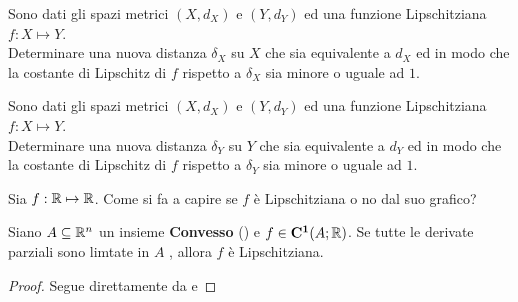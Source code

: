 \begin{example}
	Sono dati gli spazi metrici $(X,d_X)$ e $(Y,d_Y)$ ed una funzione Lipschitziana $f: X \mapsto Y$.\\
	Determinare una nuova distanza $\delta_X$ su $X$ che sia equivalente a $d_X$ ed in modo che la costante di Lipschitz di $f$ rispetto a $\delta_X$ sia minore o uguale ad $1$.
\end{example}
\begin{example}
	Sono dati gli spazi metrici $(X,d_X)$ e $(Y,d_Y)$ ed una funzione Lipschitziana $f: X \mapsto Y$.\\
	Determinare una nuova distanza $\delta_Y$ su $Y$ che sia equivalente a $d_Y$ ed in modo che la costante di Lipschitz di $f$ rispetto a $\delta_Y$ sia minore o uguale ad $1$.
\end{example}
\begin{exercise}
	Sia $f: \mathbb{R} \mapsto \mathbb{R}$. Come si fa a capire se $f$ è Lipschitziana o no dal suo grafico?
\end{exercise}

\begin{proposition}
	\label{prop:convesso_deriv_par_lim_allora_lips}
	Siano $A \subseteq \mathbb{R}^n$ un insieme \textbf{Convesso} () e $f \in \mathbf{C^{1}}(A;\mathbb{R})$. Se tutte le derivate parziali sono limtate in $A$ , allora $f$ è Lipschitziana.
	\begin{proof}
		Segue direttamente da  e 
	\end{proof}
\end{proposition}

